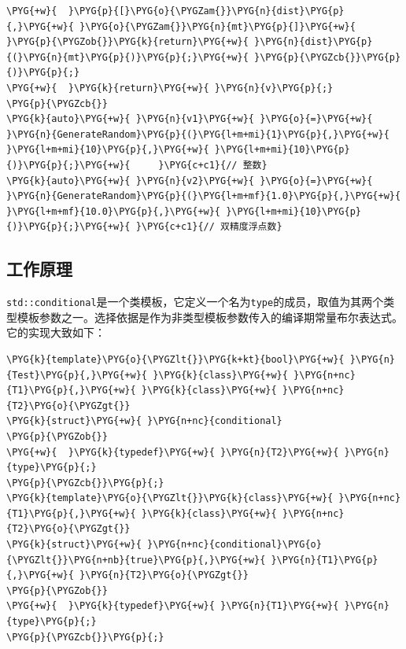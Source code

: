 \begin{itemize}
\begin{codeblockbg}
\begin{Verbatim}[commandchars=\\\{\},breaklines=true,breakanywhere=true,fontsize=\codefont,xleftmargin=17bp]
\PYG{+w}{  }\PYG{p}{[}\PYG{o}{\PYGZam{}}\PYG{n}{dist}\PYG{p}{,}\PYG{+w}{ }\PYG{o}{\PYGZam{}}\PYG{n}{mt}\PYG{p}{]}\PYG{+w}{ }\PYG{p}{\PYGZob{}}\PYG{k}{return}\PYG{+w}{ }\PYG{n}{dist}\PYG{p}{(}\PYG{n}{mt}\PYG{p}{)}\PYG{p}{;}\PYG{+w}{ }\PYG{p}{\PYGZcb{}}\PYG{p}{)}\PYG{p}{;}
\PYG{+w}{  }\PYG{k}{return}\PYG{+w}{ }\PYG{n}{v}\PYG{p}{;}
\PYG{p}{\PYGZcb{}}
\PYG{k}{auto}\PYG{+w}{ }\PYG{n}{v1}\PYG{+w}{ }\PYG{o}{=}\PYG{+w}{ }\PYG{n}{GenerateRandom}\PYG{p}{(}\PYG{l+m+mi}{1}\PYG{p}{,}\PYG{+w}{ }\PYG{l+m+mi}{10}\PYG{p}{,}\PYG{+w}{ }\PYG{l+m+mi}{10}\PYG{p}{)}\PYG{p}{;}\PYG{+w}{     }\PYG{c+c1}{// 整数}
\PYG{k}{auto}\PYG{+w}{ }\PYG{n}{v2}\PYG{+w}{ }\PYG{o}{=}\PYG{+w}{ }\PYG{n}{GenerateRandom}\PYG{p}{(}\PYG{l+m+mf}{1.0}\PYG{p}{,}\PYG{+w}{ }\PYG{l+m+mf}{10.0}\PYG{p}{,}\PYG{+w}{ }\PYG{l+m+mi}{10}\PYG{p}{)}\PYG{p}{;}\PYG{+w}{ }\PYG{c+c1}{// 双精度浮点数}
\end{Verbatim}
\end{codeblockbg}

\end{itemize}



\subsection{工作原理}



\texttt{std::\allowbreak{}conditional}是一个类模板，它定义一个名为\texttt{type}的成员，取值为其两个类型模板参数之一。选择依据是作为非类型模板参数传入的编译期常量布尔表达式。它的实现大致如下：



\begin{codeblockbg}
\begin{Verbatim}[commandchars=\\\{\},breaklines=true,breakanywhere=true,fontsize=\codefont,xleftmargin=17bp]
\PYG{k}{template}\PYG{o}{\PYGZlt{}}\PYG{k+kt}{bool}\PYG{+w}{ }\PYG{n}{Test}\PYG{p}{,}\PYG{+w}{ }\PYG{k}{class}\PYG{+w}{ }\PYG{n+nc}{T1}\PYG{p}{,}\PYG{+w}{ }\PYG{k}{class}\PYG{+w}{ }\PYG{n+nc}{T2}\PYG{o}{\PYGZgt{}}
\PYG{k}{struct}\PYG{+w}{ }\PYG{n+nc}{conditional}
\PYG{p}{\PYGZob{}}
\PYG{+w}{  }\PYG{k}{typedef}\PYG{+w}{ }\PYG{n}{T2}\PYG{+w}{ }\PYG{n}{type}\PYG{p}{;}
\PYG{p}{\PYGZcb{}}\PYG{p}{;}
\PYG{k}{template}\PYG{o}{\PYGZlt{}}\PYG{k}{class}\PYG{+w}{ }\PYG{n+nc}{T1}\PYG{p}{,}\PYG{+w}{ }\PYG{k}{class}\PYG{+w}{ }\PYG{n+nc}{T2}\PYG{o}{\PYGZgt{}}
\PYG{k}{struct}\PYG{+w}{ }\PYG{n+nc}{conditional}\PYG{o}{\PYGZlt{}}\PYG{n+nb}{true}\PYG{p}{,}\PYG{+w}{ }\PYG{n}{T1}\PYG{p}{,}\PYG{+w}{ }\PYG{n}{T2}\PYG{o}{\PYGZgt{}}
\PYG{p}{\PYGZob{}}
\PYG{+w}{  }\PYG{k}{typedef}\PYG{+w}{ }\PYG{n}{T1}\PYG{+w}{ }\PYG{n}{type}\PYG{p}{;}
\PYG{p}{\PYGZcb{}}\PYG{p}{;}
\end{Verbatim}
\end{codeblockbg}


